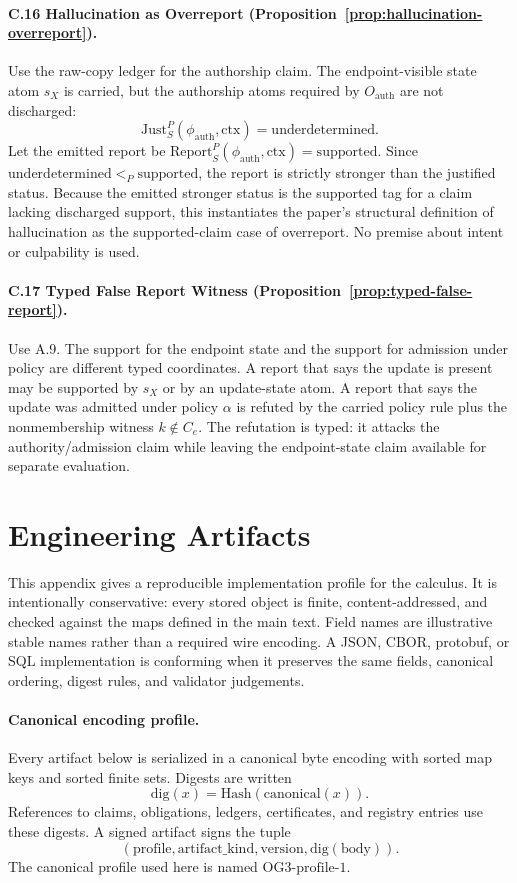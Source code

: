 \documentclass[11pt,twoside]{article}
\theoremstyle{definition}
\newcommand{\Just}{\mathrm{Just}}
\newcommand{\Report}{\mathrm{Report}}
\newcommand{\ctx}{\mathrm{ctx}}
\newcommand{\supported}{\mathrm{supported}}
\newcommand{\underdetermined}{\mathrm{underdetermined}}
\begin{document}
\paragraph{C.16 Hallucination as Overreport (Proposition~\ref{prop:hallucination-overreport}).}
Use the raw-copy ledger for the authorship claim. The endpoint-visible state
atom $s_X$ is carried, but the authorship atoms required by
$O_{\mathrm{auth}}$ are not discharged:
\[
  \Just_S^P(\phi_{\mathrm{auth}},\ctx)=\underdetermined.
\]
Let the emitted report be
$\Report_S^P(\phi_{\mathrm{auth}},\ctx)=\supported$. Since
$\underdetermined<_P\supported$, the report is strictly stronger than the
justified status. Because the emitted stronger status is the supported tag for
a claim lacking discharged support, this instantiates the paper's structural
definition of hallucination as the supported-claim case of overreport. No
premise about intent or culpability is used.

\paragraph{C.17 Typed False Report Witness (Proposition~\ref{prop:typed-false-report}).}
Use A.9. The support for the endpoint state and the support for admission under
policy are different typed coordinates. A report that says the update is
present may be supported by $s_X$ or by an update-state atom. A report that says
the update was admitted under policy $\alpha$ is refuted by the carried policy
rule plus the nonmembership witness $k\notin C_e$. The refutation is typed: it
attacks the authority/admission claim while leaving the endpoint-state claim
available for separate evaluation.

\section{Engineering Artifacts}
\label{app:engineering-artifacts}

This appendix gives a reproducible implementation profile for the calculus. It
is intentionally conservative: every stored object is finite, content-addressed,
and checked against the maps defined in the main text. Field names are
illustrative stable names rather than a required wire encoding. A JSON, CBOR,
protobuf, or SQL implementation is conforming when it preserves the same fields,
canonical ordering, digest rules, and validator judgements.

\paragraph{Canonical encoding profile.}
Every artifact below is serialized in a canonical byte encoding with sorted map
keys and sorted finite sets. Digests are written
\[
  \mathrm{dig}(x)=\mathrm{Hash}(\mathrm{canonical}(x)).
\]
References to claims, obligations, ledgers, certificates, and registry entries
use these digests. A signed artifact signs the tuple
\[
  (\mathrm{profile},\mathrm{artifact\_kind},\mathrm{version},\mathrm{dig}(\mathrm{body})).
\]
The canonical profile used here is named $\mathrm{OG3\text{-}profile\text{-}1}$.
\end{document}
